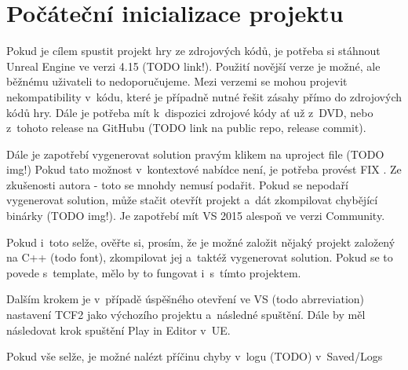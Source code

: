 
\section{Počáteční inicializace projektu}

Pokud je cílem spustit projekt hry ze zdrojových kódů, je potřeba si stáhnout Unreal Engine ve verzi 4.15 (TODO link!). Použití novější verze je možné, ale běžnému uživateli to nedoporučujeme. Mezi verzemi se mohou projevit nekompatibility v~kódu, které je případně nutné řešit zásahy přímo do zdrojových kódů hry.
Dále je potřeba mít k~dispozici zdrojové kódy ať už z~DVD, nebo z~tohoto release na GitHubu (TODO link na public repo, release commit).

Dále je zapotřebí vygenerovat solution pravým klikem na uproject file (TODO img!) Pokud tato možnost v~kontextové nabídce není, je potřeba provést FIX . Ze zkušenosti autora - toto se mnohdy nemusí podařit. Pokud se nepodaří vygenerovat solution, může stačit otevřít projekt a~dát zkompilovat chybějící binárky (TODO img!). Je zapotřebí mít VS 2015 alespoň ve verzi Community.

Pokud i~toto selže, ověřte si, prosím, že je možné založit nějaký projekt založený na C++ (todo font), zkompilovat jej a~taktéž vygenerovat solution. Pokud se to povede s~template, mělo by to fungovat i~s~tímto projektem.


Dalším krokem je v~případě úspěšného otevření ve VS (todo abrreviation) nastavení TCF2 jako výchozího projektu a~následné spuštění. Dále by měl následovat krok spuštění Play in Editor v~UE.


Pokud vše selže, je možné nalézt příčinu chyby v~logu (TODO) v~Saved/Logs


